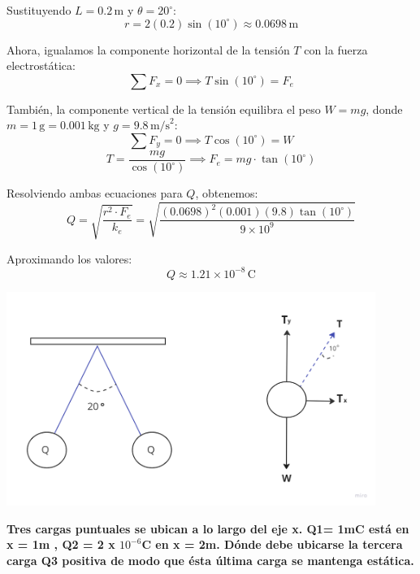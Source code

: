 \documentclass[answers]{exam} %
\begin{document}
\begin{questions}
\begin{multicols}{2}
		Sustituyendo \( L = 0.2 \, \text{m} \) y \( \theta = 20^\circ \):
		\[
			r = 2(0.2) \sin\left(10^\circ\right) \approx 0.0698 \, \text{m}
		\]

		Ahora, igualamos la componente horizontal de la tensión \( T \) con la fuerza electrostática:
		\[
			\sum F_x = 0  \implies T \sin\left(10^\circ\right) = F_e
		\]

		También, la componente vertical de la tensión equilibra el peso \( W = mg \), donde \( m = 1 \, \text{g} = 0.001 \, \text{kg} \) y \( g = 9.8 \, \text{m/s}^2 \):
		\[
			\sum F_y = 0  \implies T \cos\left(10^\circ\right) = W
		\]
		\[
			T  = \dfrac{mg}{\cos\left(10^\circ\right)} \implies F_e = mg\cdot \tan\left(10^\circ\right)
		\]

		Resolviendo ambas ecuaciones para \( Q \), obtenemos:
		\[
			Q = \sqrt{\frac{r^2 \cdot F_e}{k_e}} = \sqrt{\frac{(0.0698)^2 (0.001)(9.8) \tan(10^\circ)}{9 \times 10^9}}
		\]

		Aproximando los valores:
		\[
			Q \approx 1.21 \times 10^{-8} \, \text{C}
		\]
	\end{multicols}


	\begin{minipage}{\textwidth}
		\centering
		\includegraphics[width=0.9\textwidth]{public/g3.png}\\
	\end{minipage}

	\vspace{0.5cm}
	\newpage

	\question \large\textbf{Tres cargas puntuales se ubican a lo largo del eje x. Q1= 1mC está en x = 1m ,  Q2 = 2 x $10^{-6}$C en x = 2m. Dónde debe ubicarse la tercera carga Q3 positiva de modo que
		ésta última carga se mantenga estática.}

	\begin{multicols}{2} %


\end{multicols}
\end{questions}
\end{document}

